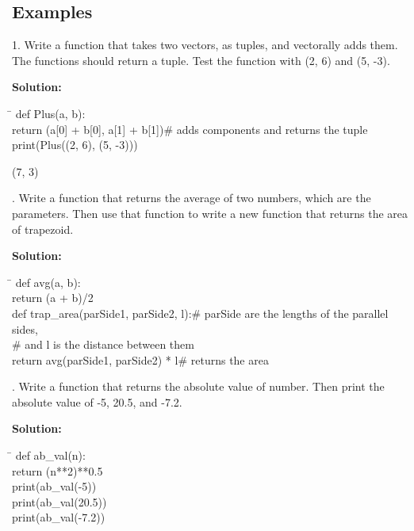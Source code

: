 \documentclass{article}
\newcommand{\icode}[1]{{\ttfamily #1}}
\newenvironment{code}{\begin{tcolorbox}\ttfamily}{\end{tcolorbox}}
\newenvironment{out}{\begin{tcolorbox}[colback=output]\ttfamily}{\end{tcolorbox}}
\begin{document}
\subsection{Examples}
1. Write a function that takes two vectors, as tuples, and vectorally adds them. The functions should return a tuple. Test the function with \icode{(2, 6)} and \icode{(5, -3)}.

\noindent \textbf{Solution:}
\begin{code}
	\begin{tabbing}
		\hspace{8 cm} \= \hspace{5 cm} \kill
		def Plus(a, b):\\
		\hspace{2 em}return (a[0] + b[0], a[1] + b[1])\>\# adds components and returns the tuple\\
		print(Plus((2, 6), (5, -3)))
	\end{tabbing}
\end{code}

\begin{out}
	(7, 3)
\end{out}

\newpage
{}. Write a function that returns the average of two numbers, which are the parameters. Then use that function to write a new function that returns the area of trapezoid. 

\noindent \textbf{Solution:}
\begin{code}
	\begin{tabbing}
		\hspace{7 cm} \= \hspace{7 cm} \kill
		def avg(a, b):\\
		\hspace{2 em}return (a + b)/2\\
		def trap\_area(parSide1, parSide2, l):\>\# parSide are the lengths of the parallel sides, \\
		\>\# and l is the distance between them\\
		\hspace{2 em}return avg(parSide1, parSide2) * l\>\# returns the area
	\end{tabbing}
\end{code}

. Write a function that returns the absolute value of number. Then print the absolute value of -5, 20.5, and -7.2.

\noindent \textbf{Solution:}
\begin{code}
	\begin{tabbing}
		\hspace{7 cm} \= \hspace{7 cm} \kill
		def ab\_val(n):\\
		\hspace{2 em}return (n**2)**0.5\\
		print(ab\_val(-5))\\
		print(ab\_val(20.5))\\
		print(ab\_val(-7.2))
	\end{tabbing}
\end{code}
\end{document}
